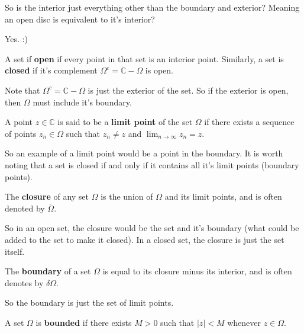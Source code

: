 \documentclass[12pt]{article}
\begin{document}
\begin{aq}
  So is the interior just everything other than the boundary and exterior? Meaning an open disc is equivalent to
  it's interior?
\end{aq}
\begin{answer}
  Yes. :)
\end{answer}

\begin{definition}
  A set if \textbf{open} if every point in that set is an interior point. Similarly, a set is \textbf{closed} 
  if it's complement $\Omega^c = \mathbb{C} - \Omega$ is open.
\end{definition}

Note that $\Omega^c = \mathbb{C} - \Omega$ is just the exterior of the set. So if the exterior is open, then 
$\Omega$ must include it's boundary.

\begin{definition}
  A point $z \in \mathbb{C}$ is said to be a \textbf{limit point} of the set $\Omega$ if there exists a sequence 
  of points $z_n \in \Omega$ such that $z_n \neq z$ and $\lim_{n \to \infty} z_n = z$. 
\end{definition}

So an example of a limit point would be a point in the boundary. It is worth noting that a set is closed 
if and only if it contains all it's limit points (boundary points).

\begin{definition}
  The \textbf{closure} of any set $\Omega$ is the union of $\Omega$ and its limit points, and is often denoted 
  by $\bar{\Omega}$. 
\end{definition}

So in an open set, the closure would be the set and it's boundary (what could be added to the set 
to make it closed). In a closed set, the closure is just the set itself. 

\begin{definition} 
  The \textbf{boundary} of a set $\Omega$ is equal to its closure minus its interior, and is often 
  denotes by $\delta \Omega$.
\end{definition}

So the boundary is just the set of limit points. 

\begin{definition}
  A set $\Omega$ is \textbf{bounded} if there exists $M > 0$ such that $\vert z \vert < M$ whenever $z \in
  \Omega$. 
\end{definition}
\end{document}
